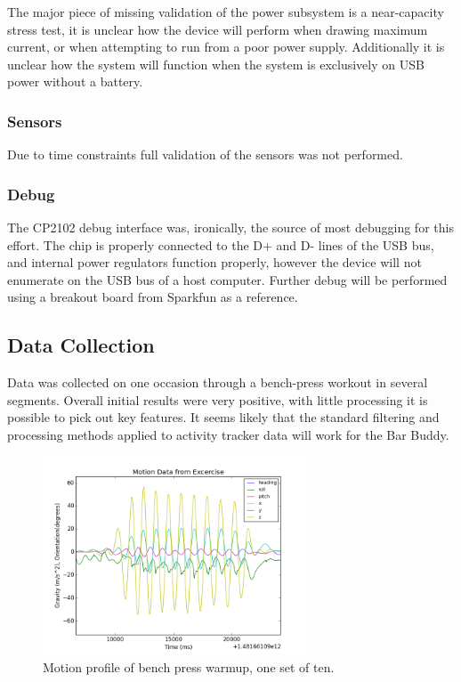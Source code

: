 \documentclass[11pt,oneside]{amsart}
\begin{document}
The major piece of missing validation of the power subsystem is a near-capacity stress test, it is unclear how the device will perform when drawing maximum current, or when attempting to run from a poor power supply. Additionally it is unclear how the system will function when the system is exclusively on USB power without a battery.
\subsubsection{Sensors}
Due to time constraints full validation of the sensors was not performed. 

\subsubsection{Debug}
The CP2102 debug interface was, ironically, the source of most debugging for this effort. The chip is properly connected to the D+ and D- lines of the USB bus, and internal power regulators function properly, however the device will not enumerate on the USB bus of a host computer. Further debug will be performed using a breakout board from Sparkfun as a reference.

\subsection{Data Collection}
Data was collected on one occasion through a bench-press workout in several segments. Overall initial results were very positive, with little processing it is possible to pick out key features. It seems likely that the standard filtering and processing methods applied to activity tracker data will work for the Bar Buddy.

\begin{figure}[htbp]
\begin{center}
\includegraphics[width=0.7\textwidth]{figures/warmup.png}
\caption{Motion profile of bench press warmup, one set of ten.}
\label{fig:warmup}
\end{center}
\end{figure}
\end{document}
